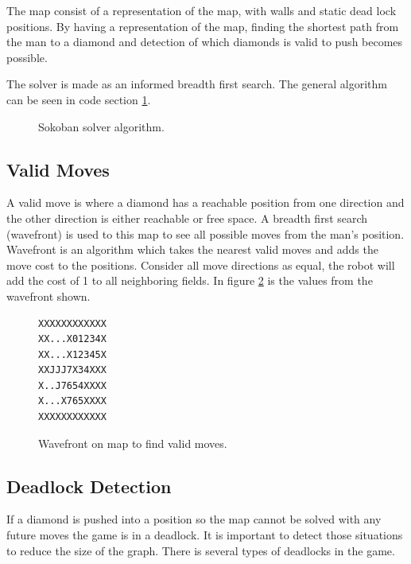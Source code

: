 The map consist of a representation of the map, with walls and static dead lock positions.
By having a representation of the map, finding the shortest path from the man to a diamond and detection of which diamonds is valid to push becomes possible.

The solver is made as an informed breadth first search.
The general algorithm can be seen in code section \ref{code:sokoban_solver}.

\begin{figure}
\centering
{}
 \caption{Sokoban solver algorithm.}
 \label{code:sokoban_solver}
\end{figure}


\subsection{Valid Moves}
A valid move is where a diamond has a reachable position from one direction and the other direction is either reachable or free space.
A breadth first search (wavefront) is used to this map to see all possible moves from the man's position.
Wavefront is an algorithm which takes the nearest valid moves and adds the move cost to the positions.
Consider all move directions as equal, the robot will add the cost of 1 to all neighboring fields.
In figure \ref{fig:wavefront} is the values from the wavefront shown.

\begin{figure}
 \centering
 \begin{minipage}{0.1\textwidth}
\begin{verbatim}
XXXXXXXXXXXX
XX...X01234X
XX...X12345X
XXJJJ7X34XXX
X..J7654XXXX
X...X765XXXX
XXXXXXXXXXXX
\end{verbatim}
 \end{minipage}
 \caption{Wavefront on map to find valid moves.}
 \label{fig:wavefront}
\end{figure}

\subsection{Deadlock Detection}
If a diamond is pushed into a position so the map cannot be solved with any future moves the game is in a deadlock.
It is important to detect those situations to reduce the size of the graph.
There is several types of deadlocks in the game.

